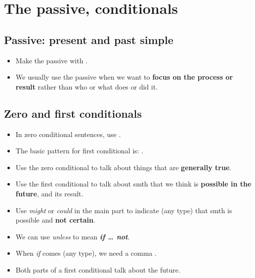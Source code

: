 \section{The passive, conditionals}

\subsection{Passive: present and past simple}
\begin{itemize}
    \item Make the passive with .
    \item We usually use the passive when we want to \textbf{focus on the process or result}
    rather than who or what does or did it.
\end{itemize}

\subsection{Zero and first conditionals}
\begin{itemize}
    \item In zero conditional sentences, use .
    \item The basic pattern for first conditional is:
    .
    \item Use the zero conditional to talk about things that are \textbf{generally true}.
    \item Use the first conditional to talk about smth that we think is \textbf{possible in the future},
    and its result.
    \item Use \textit{might} or \textit{could} in the main part to indicate (any type)
    that smth is possible and \textbf{not certain}.
    \item We can use \textit{unless} to mean \textbf{\textit{if \ldots{} not}}.
    \item When \textit{if} comes  (any type), we need a comma .
    \item[\ast] Both parts of a first conditional talk about the future.
\end{itemize}

